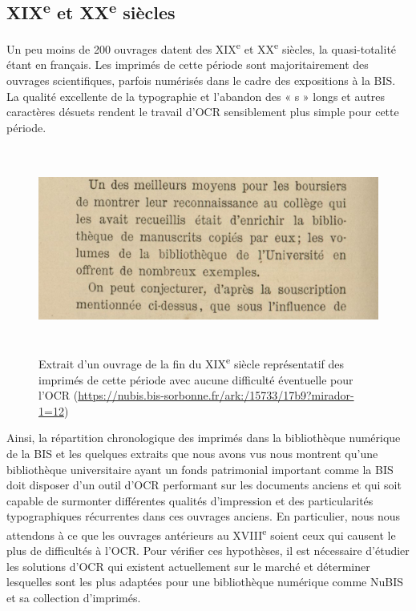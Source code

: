 \documentclass[a4paper,12pt,twoside]{book}
\begin{document}
\subsection{XIX\textsuperscript{e} et XX\textsuperscript{e} siècles}

Un peu moins de 200 ouvrages datent des XIX\textsuperscript{e} et
XX\textsuperscript{e} siècles, la quasi-totalité étant en français. Les
imprimés de cette période sont majoritairement des ouvrages
scientifiques, parfois numérisés dans le cadre des expositions à la BIS.
La qualité excellente de la typographie et l'abandon des « s » longs et
autres caractères désuets rendent le travail d'OCR sensiblement plus
simple pour cette période.

\begin{figure} [H]
	\includegraphics[width=6.26806in,height=2.63889in]{vertopal_157ae480aa4a4b07be198b586a812241/media/image11.png}
	\caption{Extrait d'un ouvrage de la fin du XIX\textsuperscript{e}
		siècle représentatif des imprimés de cette période avec aucune
		difficulté éventuelle pour l'OCR
		(\url{https://nubis.bis-sorbonne.fr/ark:/15733/17b9?mirador-1=12})}
\end{figure}




Ainsi, la répartition chronologique des imprimés dans la bibliothèque
numérique de la BIS et les quelques extraits que nous avons vus nous
montrent qu'une bibliothèque universitaire ayant un fonds patrimonial
important comme la BIS doit disposer d'un outil d'OCR performant sur les
documents anciens et qui soit capable de surmonter différentes qualités
d'impression et des particularités typographiques récurrentes dans ces
ouvrages anciens. En particulier, nous nous attendons à ce que les
ouvrages antérieurs au XVIII\textsuperscript{e} soient ceux qui causent
le plus de difficultés à l'OCR. Pour vérifier ces hypothèses, il est
nécessaire d'étudier les solutions d'OCR qui existent actuellement sur
le marché et déterminer lesquelles sont les plus adaptées pour une
bibliothèque numérique comme NuBIS et sa collection d'imprimés.
\end{document}
